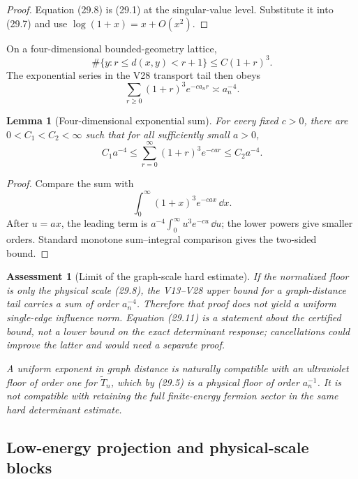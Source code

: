 \documentclass[11pt]{article}
\newtheorem{lemma}[theorem]{Lemma}
\newtheorem{assessment}[theorem]{Assessment}
\theoremstyle{remark}
\begin{document}
\begin{proof}
Equation (29.8) is (29.1) at the singular-value level.  Substitute
it into (29.7) and use
\(\log(1+x)=x+O(x^2)\).
\end{proof}

On a four-dimensional bounded-geometry lattice,
\[
 \#\{y:r\le d(x,y)<r+1\}\le C(1+r)^3.                       \tag{29.10}
\]
The exponential series in the V28 transport tail then obeys
\[
 \sum_{r\ge0}(1+r)^3e^{-c a_nr}
 \asymp a_n^{-4}.                                          \tag{29.11}
\]

\begin{lemma}[Four-dimensional exponential sum]
\label{lem:v15v29-sum}
For every fixed \(c>0\), there are \(0<C_1<C_2<\infty\) such that
for all sufficiently small \(a>0\),
\[
 C_1a^{-4}
 \le
 \sum_{r=0}^\infty(1+r)^3e^{-car}
 \le
 C_2a^{-4}.                                                 \tag{29.12}
\]
\end{lemma}

\begin{proof}
Compare the sum with
\[
 \int_0^\infty(1+x)^3e^{-cax}\,\dd x.
\]
After \(u=ax\), the leading term is
\(a^{-4}\int_0^\infty u^3e^{-cu}\,\dd u\); the lower powers give
smaller orders.  Standard monotone sum--integral comparison gives
the two-sided bound.
\end{proof}

\begin{assessment}[Limit of the graph-scale hard estimate]
\label{ass:v15v29-graph}
If the normalized floor is only the physical scale (29.8), the
V13--V28 upper bound for a graph-distance tail carries a sum of
order \(a_n^{-4}\).  Therefore that proof does not yield a uniform
single-edge influence norm.  Equation (29.11) is a statement about
the certified bound, not a lower bound on the exact determinant
response; cancellations could improve the latter and would need a
separate proof.

A uniform exponent in graph distance is naturally compatible with
an ultraviolet floor of order one for \(\widetilde T_n\), which by
(29.5) is a physical floor of order \(a_n^{-1}\).  It is not
compatible with retaining the full finite-energy fermion sector in
the same hard determinant estimate.
\end{assessment}

\subsection{Low-energy projection and physical-scale blocks}
\end{document}
